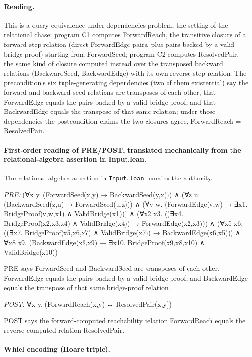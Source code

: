 \documentclass[10pt]{article}
\begin{document}
\paragraph{Reading.} This is a query-equivalence-under-dependencies problem, the setting of the relational chase: program C1 computes ForwardReach, the transitive closure of a forward step relation (direct ForwardEdge pairs, plus pairs backed by a valid bridge proof) starting from ForwardSeed; program C2 computes ResolvedPair, the same kind of closure computed instead over the transposed backward relations (BackwardSeed, BackwardEdge) with its own reverse step relation. The precondition's six tuple-generating dependencies (two of them existential) say the forward and backward seed relations are transposes of each other, that ForwardEdge equals the pairs backed by a valid bridge proof, and that BackwardEdge equals the transpose of that same relation; under those dependencies the postcondition claims the two closures agree, ForwardReach = ResolvedPair.

\paragraph{First-order reading of PRE/POST, translated mechanically from the relational-algebra assertion in Input.lean.} The relational-algebra assertion in \texttt{Input.lean} remains the authority.

\textit{PRE:} (∀x y. (ForwardSeed(x,y) → BackwardSeed(y,x))) ∧ (∀z u. (BackwardSeed(z,u) → ForwardSeed(u,z))) ∧ (∀v w. (ForwardEdge(v,w) → ∃x1. BridgeProof(v,w,x1) ∧ ValidBridge(x1))) ∧ (∀x2 x3. ((∃x4. BridgeProof(x2,x3,x4) ∧ ValidBridge(x4)) → ForwardEdge(x2,x3))) ∧ (∀x5 x6. ((∃x7. BridgeProof(x5,x6,x7) ∧ ValidBridge(x7)) → BackwardEdge(x6,x5))) ∧ ∀x8 x9. (BackwardEdge(x8,x9) → ∃x10. BridgeProof(x9,x8,x10) ∧ ValidBridge(x10))\par PRE says ForwardSeed and BackwardSeed are transposes of each other, ForwardEdge equals the pairs backed by a valid bridge proof, and BackwardEdge equals the transpose of that same bridge-proof relation.

\textit{POST:} ∀x y. (ForwardReach(x,y) ↔ ResolvedPair(x,y))\par POST says the forward-computed reachability relation ForwardReach equals the reverse-computed relation ResolvedPair.

\paragraph{Whiel encoding (Hoare triple).}
\end{document}
